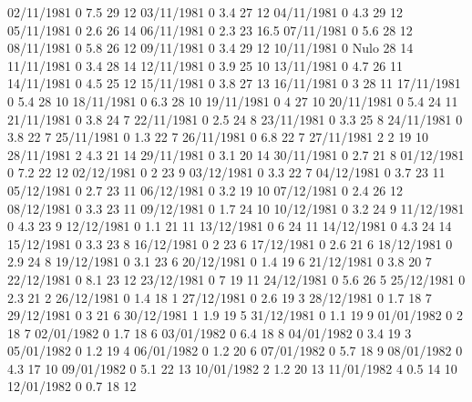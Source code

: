 02/11/1981  0      7.5    29     12 
03/11/1981  0      3.4    27     12 
04/11/1981  0      4.3    29     12 
05/11/1981  0      2.6    26     14 
06/11/1981  0      2.3    23     16.5 
07/11/1981  0      5.6    28     12 
08/11/1981  0      5.8    26     12 
09/11/1981  0      3.4    29     12 
10/11/1981  0     Nulo    28     14 
11/11/1981  0      3.4    28     14 
12/11/1981  0      3.9    25     10 
13/11/1981  0      4.7    26     11 
14/11/1981  0      4.5    25     12 
15/11/1981  0      3.8    27     13 
16/11/1981  0      3      28     11 
17/11/1981  0      5.4    28     10 
18/11/1981  0      6.3    28     10 
19/11/1981  0      4      27     10 
20/11/1981  0      5.4    24     11 
21/11/1981  0      3.8    24     7 
22/11/1981  0      2.5    24     8 
23/11/1981  0      3.3    25     8 
24/11/1981  0      3.8    22     7 
25/11/1981  0      1.3    22     7 
26/11/1981  0      6.8    22     7 
27/11/1981  2      2      19     10 
28/11/1981  2      4.3    21     14 
29/11/1981  0      3.1    20     14 
30/11/1981  0      2.7    21     8 
01/12/1981  0      7.2    22     12 
02/12/1981  0      2      23     9 
03/12/1981  0      3.3    22     7 
04/12/1981  0      3.7    23     11 
05/12/1981  0      2.7    23     11 
06/12/1981  0      3.2    19     10 
07/12/1981  0      2.4    26     12 
08/12/1981  0      3.3    23     11 
09/12/1981  0      1.7    24     10 
10/12/1981  0      3.2    24     9 
11/12/1981  0      4.3    23     9 
12/12/1981  0      1.1    21     11 
13/12/1981  0      6      24     11 
14/12/1981  0      4.3    24     14 
15/12/1981  0      3.3    23     8 
16/12/1981  0      2      23     6 
17/12/1981  0      2.6    21     6 
18/12/1981  0      2.9    24     8 
19/12/1981  0      3.1    23     6 
20/12/1981  0      1.4    19     6 
21/12/1981  0      3.8    20     7 
22/12/1981  0      8.1    23     12 
23/12/1981  0      7      19     11 
24/12/1981  0      5.6    26     5 
25/12/1981  0      2.3    21     2 
26/12/1981  0      1.4    18     1 
27/12/1981  0      2.6    19     3 
28/12/1981  0      1.7    18     7 
29/12/1981  0      3      21     6 
30/12/1981  1      1.9    19     5 
31/12/1981  0      1.1    19     9 
01/01/1982  0      2      18     7 
02/01/1982  0      1.7    18     6 
03/01/1982  0      6.4    18     8 
04/01/1982  0      3.4    19     3 
05/01/1982  0      1.2    19     4 
06/01/1982  0      1.2    20     6 
07/01/1982  0      5.7    18     9 
08/01/1982  0      4.3    17     10 
09/01/1982  0      5.1    22     13 
10/01/1982  2      1.2    20     13 
11/01/1982  4      0.5    14     10 
12/01/1982  0      0.7    18     12 
